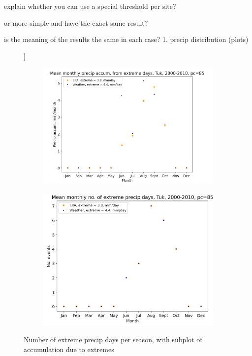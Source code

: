 \documentclass[draft]{agujournal2019}
\begin{document}
explain whether you can use a special threshold per site?

or more simple and have the exact same result?

is the meaning of the results the same in each case?
1. precip distribution (plots)



\begin{figure}[h!tbp]]
\centering
\begin{subfigure}[b]{0.55\textwidth}
   \includegraphics[width=1\linewidth]{figures/accum_extreme_days_tuk_00_10.png}
   \caption{}
   \label{fig:Ng1} 
\end{subfigure}

\begin{subfigure}[b]{0.55\textwidth}
   \includegraphics[width=1\linewidth]{figures/mean_no_extreme_days_tuk_00_10.png}
   \caption{}
   \label{fig:Ng2}
\end{subfigure}

\caption{Number of extreme precip days per season, with subplot of accumulation due to extremes}
\end{figure}
\end{document}
